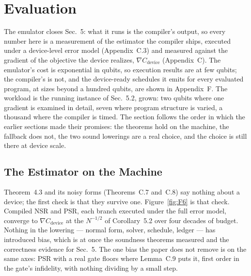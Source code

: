 \newcommand{\owed}[1]{{\color{red}\textbf{[owed: #1]}}}

\section{Evaluation}
\label{sec:eval}

The emulator closes Sec.~5: what it runs is the compiler's output, so every
number here is a measurement of the estimator the compiler ships, executed
under a device-level error model (Appendix~C.3) and measured against the
gradient of the objective the device realizes, $\nabla C_{\mathrm{device}}$
(Appendix~C). The emulator's cost is exponential in qubits, so execution
results are at few qubits; the compiler's is not, and the device-ready
schedules it emits for every evaluated program, at sizes beyond a hundred
qubits, are shown in Appendix~F. The workload is the running instance of
Sec.~5.2, grown: two qubits where one gradient is examined in detail,
seven where program structure is varied, a thousand where the compiler is
timed. The section follows the order in which the earlier sections made
their promises: the theorems hold on the machine, the fallback does not,
the two sound lowerings are a real choice, and the choice is still there
at device scale.

\subsection{The Estimator on the Machine}
\label{sec:eval-machine}

Theorem~4.3 and its noisy forms (Theorems~C.7 and~C.8) say nothing about a
device; the first check is that they survive one. Figure~\ref{fig:F6} is
that check. Compiled NSR and PSR, each branch executed under the full error
model, converge to $\nabla C_{\mathrm{device}}$ at the $N^{-1/2}$ of
Corollary~5.2 over four decades of budget. Nothing in the lowering ---
normal form, solver, schedule, ledger --- has introduced bias, which is at
once the soundness theorems measured and the correctness evidence for
Sec.~5. The one bias the paper does not remove is on the same axes: PSR
with a real gate floors where Lemma~C.9 puts it, first order in the gate's
infidelity, with nothing dividing by a small step.


